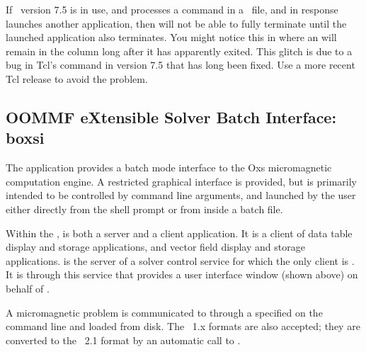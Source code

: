 If \Tcl\ version 7.5 is in use, and  processes
a  command in a \MIF\ file, and in response
launches another application, then  will not be
able to fully terminate until the launched application also
terminates.  You might notice this in  where
an  will remain in the  column
long after it has apparently exited.  This glitch is due to a
bug in Tcl's  command in version 7.5 that has long
been fixed.  Use a more recent Tcl release to avoid the problem.


\subsection{OOMMF eXtensible Solver Batch Interface: boxsi}\label{sec:boxsi}%

\begin{center}
\end{center}

The application  provides a batch mode interface to the Oxs
micromagnetic computation engine.  A restricted graphical interface is
provided, but  is primarily intended to be controlled by
command line arguments, and launched by the user either directly from
the shell prompt or from inside a batch file.

Within the ,  is both a server and a client
application. It is a client of data table display and storage
applications, and vector field display and storage applications.
 is the server of a solver control service for which the only
client is .  It is through
this service that  provides a user interface window (shown
above) on behalf of .

A micromagnetic problem is communicated to  through a
 specified on the command line
and loaded from disk.  The \MIF~1.x formats are also accepted; they are
converted to the \MIF~2.1 format by an automatic call to
.

